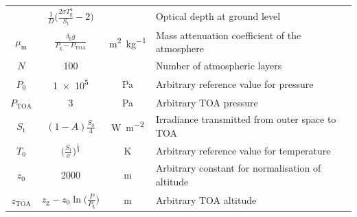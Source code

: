 \documentclass[a4paper,10pt,twocolumn,\classoptions]{article}
\newcommand{\zTOA}{z_\text{TOA}}
\newcommand{\PTOA}{P_\text{TOA}}
\begin{document}
\begin{table}[h]
\begin{tabular}[b]{cccp{}}
{    \midrule
    $\delta_\text{g}$ & $\frac{1}{D} \Big( \frac{2 \sigma T_\text{g}^4}{S_\text{t}} - 2 \Big)$ &                                                   & Optical depth at ground level                                                             \\
    $\mu_\text{m}$    & $\frac{\delta_\text{g} g}{P_\text{g} - \PTOA}$                         & \unit{\square\metre\per\kilogram}                 & Mass attenuation coefficient of the atmosphere                                            \\
    $N$               & \num{100}                                                              &                                                   & Number of atmospheric layers                                                              \\
    $P_0$             & \num{1e5}                                                              & \unit{\pascal}                                    & Arbitrary reference value for pressure                                                    \\
    $\PTOA$           & \num{3}                                                                & \unit{\pascal}                                    & Arbitrary TOA pressure                                                                    \\
    $S_\text{t}$      & $(1 - A) \frac{S_0}{4}$                                                & \unit{\watt\per\square\metre}                     & Irradiance transmitted from outer space to TOA                                            \\
    $T_0$             & $\big( \frac{S_\text{t}}{\sigma} \big)^\frac{1}{4}$                    & \unit{\kelvin}                                    & Arbitrary reference value for temperature                                                 \\
    $z_0$             & \num{2000}                                                             & \unit{\metre}                                     & Arbitrary constant for normalisation of altitude                                          \\
    $\zTOA$           & $z_\text{g} - z_0 \ln{\Big( \frac{P}{P_\text{g}} \Big)}$               & \unit{\metre}                                     & Arbitrary TOA altitude                                                                    \\
    \bottomrule
  \end{tabular}
\end{table}
\end{document}
